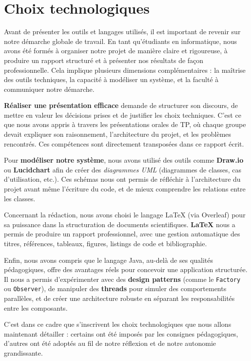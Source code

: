 \section{Choix technologiques}

Avant de présenter les outils et langages utilisés, il est important de revenir sur notre démarche globale de travail. En tant qu’étudiants en informatique, nous avons été formés à organiser notre projet de manière claire et rigoureuse, à produire un rapport structuré et à présenter nos résultats de façon professionnelle. Cela implique plusieurs dimensions complémentaires : la maîtrise des outils techniques, la capacité à modéliser un système, et la faculté à communiquer notre démarche.

\textbf{Réaliser une présentation efficace} demande de structurer son discours, de mettre en valeur les décisions prises et de justifier les choix techniques. C’est ce que nous avons appris à travers les présentations orales de TP, où chaque groupe devait expliquer son raisonnement, l’architecture du projet, et les problèmes rencontrés. Ces compétences sont directement transposées dans ce rapport écrit.

Pour \textbf{modéliser notre système}, nous avons utilisé des outils comme \textbf{Draw.io} ou \textbf{Lucidchart} afin de créer des \textit{diagrammes UML} (diagrammes de classes, cas d’utilisation, etc.). Ces schémas nous ont permis de réfléchir à l’architecture du projet avant même l’écriture du code, et de mieux comprendre les relations entre les classes.

Concernant la rédaction, nous avons choisi le langage \LaTeX{} (via Overleaf) pour sa puissance dans la structuration de documents scientifiques. \textbf{LaTeX} nous a permis de produire un rapport professionnel, avec une gestion automatique des titres, références, tableaux, figures, listings de code et bibliographie.

Enfin, nous avons compris que le langage Java, au-delà de ses qualités pédagogiques, offre des avantages réels pour concevoir une application structurée. Il nous a permis d’expérimenter avec des \textbf{design patterns} (comme le \texttt{Factory} ou \texttt{Observer}), de manipuler des \textbf{threads} pour simuler des comportements parallèles, et de créer une architecture robuste en séparant les responsabilités entre les composants.

C’est dans ce cadre que s’inscrivent les choix technologiques que nous allons maintenant détailler : certains ont été imposés par les consignes pédagogiques, d’autres ont été adoptés au fil de notre réflexion et de notre autonomie grandissante.

